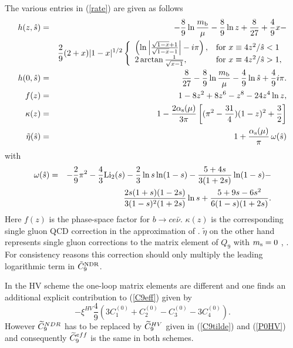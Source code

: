 The various entries in (\ref{rate}) are given as follows
\begin{eqnarray} \label{phasespace}
h(z, \hat s) & = & -\frac{8}{9}\ln\frac{m_{\rm b}}{\mu} - \frac{8}{9}\ln z +
\frac{8}{27} + \frac{4}{9} x - \\
& & \frac{2}{9} (2+x) |1-x|^{1/2} \left\{
\begin{array}{ll}
\left( \ln\left| \frac{\sqrt{1-x} + 1}{\sqrt{1-x} - 1}\right| - i\pi \right),
 & \mbox{for } x \equiv 4 z^2/\hat s < 1 \nonumber \\
2 \arctan \frac{1}{\sqrt{x-1}}, & \mbox{for } x \equiv 4 z^2/\hat s
 > 1,
\end{array}
\right. \\
h(0, \hat s) & = &
\frac{8}{27} -\frac{8}{9} \ln\frac{m_{\rm b}}{\mu} - \frac{4}{9} \ln
\hat s + \frac{4}{9} i\pi. \\ 
f(z) & = & 1 - 8 z^2 + 8 z^6 - z^8 - 24 z^4 \ln z, \\
\kappa(z)  & = & 1 - \frac{2 \alpha_{\rm s}(\mu)}{3\pi}\left[(\pi^2 -
\frac{31}{4})(1-z)^2 + \frac{3}{2} \right]  \label{eq:kappaz} \\
\tilde\eta(\hat s) & = & 1 + \frac{\alpha_{\rm s}(\mu)}{\pi}\, \omega(\hat s)
\end{eqnarray}
with
\begin{eqnarray} \label{omega}
\omega(\hat s) & = & - \frac{2}{9} \pi^2 - \frac{4}{3}\mbox{Li}_2(s) -
\frac{2}{3}
\ln s \ln(1-s) - \frac{5+4s}{3(1+2s)}\ln(1-s) - \nonumber \\
& &  \frac{2 s (1+s) (1-2s)}{3(1-s)^2 (1+2s)} \ln s + \frac{5+9s-6s^2}{6
(1-s) (1+2s)}.
\end{eqnarray}
Here $f(z)$ is the phase-space factor for $b \to c e \bar\nu$.
$\kappa(z)$ is the corresponding single
gluon QCD correction \cite{CM:78} in the approximation of \cite{KM:89}.
$\tilde\eta$ on the other hand represents single gluon
corrections to the matrix element of $Q_9$ with $m_{\rm s} = 0$ \cite{JK:89},
\cite{misiak:94}. For consistency reasons this correction should only
multiply the leading logarithmic term in $\tilde{C}_9^{\rm NDR}$.

In the HV scheme the one-loop matrix elements are different and one
finds an additional explicit contribution to (\ref{C9eff}) given by
\cite{burasmuenz:95}
\begin{equation} \label{MEHV}
- \xi^{HV} \frac{4}{9} \left( 3 C_1^{(0)} + C_2^{(0)} - C_3^{(0)} - 3
C_4^{(0)} \right).
\end{equation}
However $\widetilde C_9^{NDR}$ has to be replaced by $\widetilde C_9^{HV}$ given in
(\ref{C9tilde}) and (\ref{P0HV}) and consequently $\widetilde C_9^{eff}$ is the
same in both schemes.

